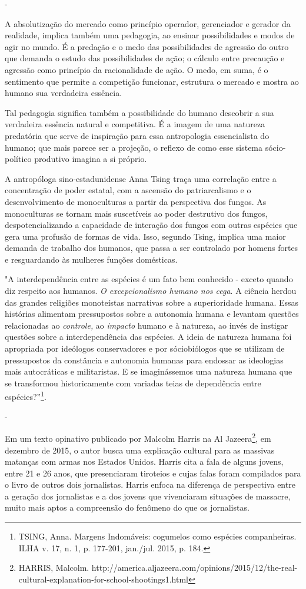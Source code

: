 -

A absolutização do mercado como princípio operador, gerenciador e
gerador da realidade, implica também uma pedagogia, ao ensinar
possibilidades e modos de agir no mundo. É a predação e o medo das
possibilidades de agressão do outro que demanda o estudo das
possibilidades de ação; o cálculo entre precaução e agressão como
princípio da racionalidade de ação. O medo, em suma, é o sentimento que
permite a competição funcionar, estrutura o mercado e mostra ao humano
sua verdadeira essência.

Tal pedagogia significa também a possibilidade do humano descobrir a sua
verdadeira essência natural e competitiva. É a imagem de uma natureza
predatória que serve de inspiração para essa antropologia essencialista
do humano; que mais parece ser a projeção, o reflexo de como esse
sistema sócio-político produtivo imagina a si próprio.

A antropóloga sino-estadunidense Anna Tsing traça uma correlação entre a
concentração de poder estatal, com a ascensão do patriarcalismo e o
desenvolvimento de monoculturas a partir da perspectiva dos fungos. As
monoculturas se tornam mais suscetíveis ao poder destrutivo dos fungos,
despotencializando a capacidade de interação dos fungos com outras
espécies que gera uma profusão de formas de vida. Isso, segundo Tsing,
implica uma maior demanda de trabalho dos humanos, que passa a ser
controlado por homens fortes e resguardando às mulheres funções
domésticas.

"A interdependência entre as espécies é um fato bem conhecido - exceto
quando diz respeito aos humanos. \emph{O excepcionalismo humano nos
cega}. A ciência herdou das grandes religiões monoteístas narrativas
sobre a superioridade humana. Essas histórias alimentam pressupostos
sobre a autonomia humana e levantam questões relacionadas ao
\emph{controle,} ao \emph{impacto} humano e à natureza, ao invés de
instigar questões sobre a interdependência das espécies. A ideia de
natureza humana foi apropriada por ideólogos conservadores e por
sóciobiólogos que se utilizam de pressupostos da constância e autonomia
humanas para endossar as ideologias mais autocráticas e militaristas. E
se imaginássemos uma natureza humana que se transformou historicamente
com variadas teias de dependência entre espécies?''\footnote{TSING,
  Anna. Margens Indomáveis: cogumelos como espécies companheiras. ILHA
  v. 17, n. 1, p. 177-201, jan./jul. 2015, p. 184.}.

-

Em um texto opinativo publicado por Malcolm Harris na Al Jazeera\footnote{HARRIS,
  Malcolm.
  http://america.aljazeera.com/opinions/2015/12/the-real-cultural-explanation-for-school-shootings1.html},
em dezembro de 2015, o autor busca uma explicação cultural para as
massivas matanças com armas nos Estados Unidos. Harris cita a fala de
alguns jovens, entre 21 e 26 anos, que presenciaram tiroteios e cujas
falas foram compilados para o livro de outros dois jornalistas. Harris
enfoca na diferença de perspectiva entre a geração dos jornalistas e a
dos jovens que vivenciaram situações de massacre, muito mais aptos a
compreensão do fenômeno do que os jornalistas.

